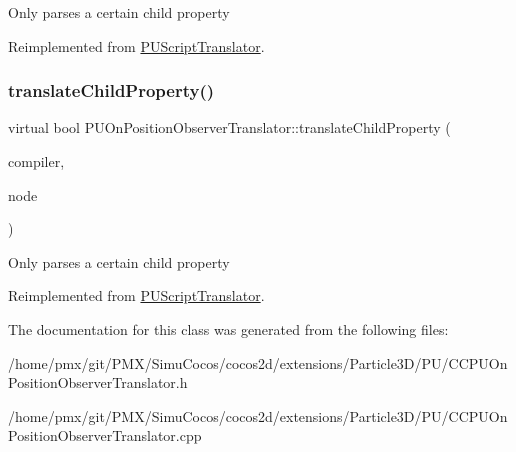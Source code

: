 Only parses a certain child property 

Reimplemented from \hyperlink{classPUScriptTranslator_a0374d83a8a04e57918975d525e0f8fe8}{P\+U\+Script\+Translator}.

\mbox{\label{classPUOnPositionObserverTranslator_a0084342b8373c38a2161d4a14b7ea868}} 
\subsubsection{\texorpdfstring{translate\+Child\+Property()}{translateChildProperty()}\hspace{0.1cm}{\footnotesize\ttfamily [2/2]}}
{\footnotesize\ttfamily virtual bool P\+U\+On\+Position\+Observer\+Translator\+::translate\+Child\+Property (\begin{DoxyParamCaption}\item[{\hyperlink{classPUScriptCompiler}{P\+U\+Script\+Compiler} $\ast$}]{compiler,  }\item[{\hyperlink{classPUAbstractNode}{P\+U\+Abstract\+Node} $\ast$}]{node }\end{DoxyParamCaption})\hspace{0.3cm}{\ttfamily [virtual]}}

Only parses a certain child property 

Reimplemented from \hyperlink{classPUScriptTranslator_a0374d83a8a04e57918975d525e0f8fe8}{P\+U\+Script\+Translator}.



The documentation for this class was generated from the following files\+:\begin{DoxyCompactItemize}
\item 
/home/pmx/git/\+P\+M\+X/\+Simu\+Cocos/cocos2d/extensions/\+Particle3\+D/\+P\+U/C\+C\+P\+U\+On\+Position\+Observer\+Translator.\+h\item 
/home/pmx/git/\+P\+M\+X/\+Simu\+Cocos/cocos2d/extensions/\+Particle3\+D/\+P\+U/C\+C\+P\+U\+On\+Position\+Observer\+Translator.\+cpp\end{DoxyCompactItemize}
